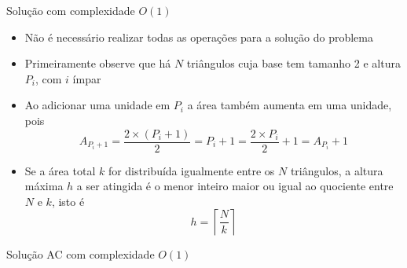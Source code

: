 \begin{frame}[fragile]{Solução com complexidade $O(1)$}

    \begin{itemize}
        \item Não é necessário realizar todas as operações para a solução do problema
        \pause

        \item Primeiramente observe que há $N$ triângulos cuja base tem tamanho 2 e altura
            $P_i$, com $i$ ímpar
        \pause

        \item Ao adicionar uma unidade em $P_i$ a área também aumenta em uma unidade, pois
        \[
            A_{P_i + 1} = \frac{2 \times (P_i + 1)}{2} = P_i + 1 = \frac{2\times  P_i}{2} + 1 = A_{P_i} + 1
        \]
        \pause

        \item Se a área total $k$ for distribuída igualmente entre os $N$ triângulos, a altura
            máxima $h$ a ser atingida é o menor inteiro maior ou igual ao quociente entre $N$ e 
            $k$, isto é
        \[
            h = \left\lceil \frac{N}{k} \right\rceil
        \]
    \end{itemize}

\end{frame}

\begin{frame}[fragile]{Solução AC com complexidade $O(1)$}
\end{frame}
